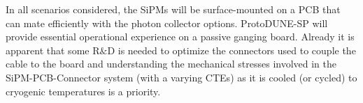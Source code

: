 In all scenarios considered, the SiPMs will be surface-mounted on a PCB that can mate efficiently with the photon
collector options. ProtoDUNE-SP will provide essential operational experience on a passive ganging board. Already it is apparent that  some R$\&$D is needed to optimize the connectors used to couple the cable to the board and understanding the 
mechanical stresses involved in the SiPM-PCB-Connector system (with a varying CTEs) as it
is cooled (or cycled) to cryogenic temperatures is a priority.










